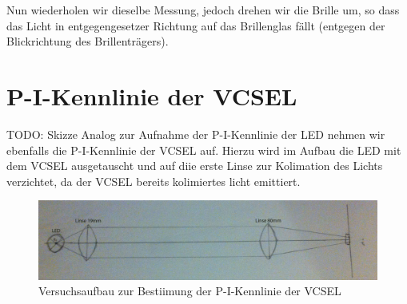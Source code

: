 \documentclass[bigchapter,colorback,accentcolor=tud4b,linedtoc,11pt]{tudreport}
\begin{document}
Nun wiederholen wir dieselbe Messung, jedoch drehen wir die Brille um, so dass das Licht in entgegengesetzer Richtung auf das Brillenglas fällt (entgegen der Blickrichtung des Brillenträgers).

\begin{center}
\begin{figure}[H]
\end{figure}
\end{center}

\section{P-I-Kennlinie der VCSEL}
TODO: Skizze
Analog zur Aufnahme der P-I-Kennlinie der LED nehmen wir ebenfalls die P-I-Kennlinie der VCSEL auf. Hierzu wird im Aufbau die LED mit dem VCSEL ausgetauscht und auf diie erste Linse zur Kolimation des Lichts verzichtet, da der VCSEL bereits kolimiertes licht emittiert.
\begin{figure}[ht!]
\centering
\includegraphics[width=150mm]{img/skizzen/versuch_a.jpg}
\caption{Versuchsaufbau zur Bestiimung der P-I-Kennlinie der VCSEL}
\label{PI-Kennlinie-VCSEL}
\end{figure}
\end{document}
